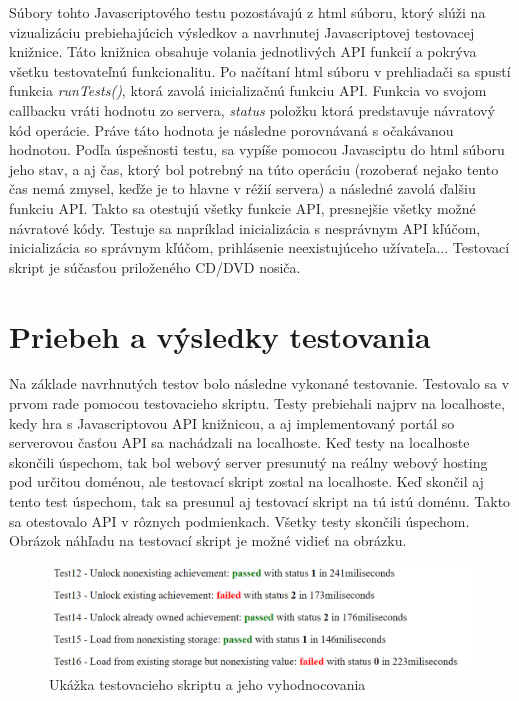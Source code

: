 Súbory tohto Javascriptového testu pozostávajú z html súboru, ktorý slúži na vizualizáciu prebiehajúcich výsledkov a navrhnutej Javascriptovej testovacej knižnice. Táto knižnica obsahuje volania jednotlivých API funkcií a pokrýva všetku testovateľnú funkcionalitu. Po načítaní html súboru v prehliadači sa spustí funkcia \textit{runTests()}, ktorá zavolá inicializačnú funkciu API. Funkcia vo svojom callbacku vráti hodnotu zo servera, \textit{status} položku ktorá predstavuje návratový kód operácie. Práve táto hodnota je následne porovnávaná s očakávanou hodnotou. Podľa úspešnosti testu, sa vypíše pomocou Javasciptu do html súboru jeho stav, a aj čas, ktorý bol potrebný na túto operáciu (rozoberať nejako tento čas nemá zmysel, keďže je to hlavne v réžií servera) a následné zavolá ďalšiu funkciu API. Takto sa otestujú všetky funkcie API, presnejšie všetky možné návratové kódy. Testuje sa napríklad inicializácia s nesprávnym API kľúčom, inicializácia so správnym kľúčom, prihlásenie neexistujúceho užívateľa... Testovací skript je súčasťou priloženého CD/DVD nosiča.

\section{Priebeh a výsledky testovania}
Na základe navrhnutých testov bolo následne vykonané testovanie. Testovalo sa v prvom rade pomocou testovacieho skriptu. Testy prebiehali najprv na localhoste, kedy hra s Javascriptovou API knižnicou, a aj implementovaný portál so serverovou časťou API sa nachádzali na localhoste. Keď testy na localhoste skončili úspechom, tak bol webový server presunutý na reálny webový hosting pod určitou doménou, ale testovací skript zostal na localhoste. Keď skončil aj tento test úspechom, tak sa presunul aj testovací skript na tú istú doménu. Takto sa otestovalo API v rôznych podmienkach. Všetky testy skončili úspechom. Obrázok náhľadu na testovací skript je možné vidieť na obrázku. 
\begin{figure}[h]
  \centering
  \includegraphics[scale=0.45]{fig/tests.png}
  \caption{Ukážka testovacieho skriptu a jeho vyhodnocovania}
  \label{fig:test}
\end{figure}

